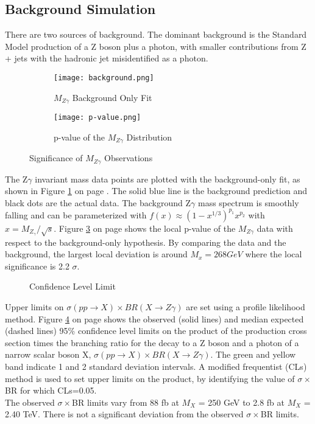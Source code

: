 \documentclass[12pt]{article}
\begin{document}
\subsection{Background Simulation}
There are two sources of background. The dominant background is the Standard Model production of a Z boson plus a photon, with smaller contributions from Z + jets with the hadronic jet misidentified as a photon.\\
\begin{figure}
\centering
\begin{subfigure}{.5\textwidth}
  \centering
  \texttt{[image: background.png]}
  \caption{$M_{Z\gamma}$ Background Only Fit}
  \label{background}
\end{subfigure}%
\begin{subfigure}{.5\textwidth}
  \centering
  \texttt{[image: p-value.png]}
  \caption{p-value of the $M_{Z\gamma}$ Distribution}
  \label{p-value}
\end{subfigure}
\caption{Significance of $M_{Z\gamma}$ Observations}
\end{figure}
The Z$\gamma$ invariant mass data points are plotted with the background-only fit, as shown in Figure \ref{background} on page \pageref{background}. The solid blue line is the background prediction and black dots are the actual data. The background Z$\gamma$ mass spectrum is smoothly falling and can be parameterized with $f(x)\approx(1-x^{1/3})^{p_1}x^{p_2}$ with $x = M_{Z_\gamma} / \sqrt{s}$. Figure \ref{p-value} on page \pageref{p-value} shows the local p-value of the $M_{Z\gamma}$ data with respect to the background-only hypothesis. By comparing the data and the background, the largest local deviation is around $M_x=268GeV$ where the local significance is 2.2 $\sigma$.\\
\begin{figure}[H]
\begin{center}
\caption[Caption for LOF]{Confidence Level Limit}
\label{CL_limit}
\end{center}
\end{figure}
Upper limits on $\sigma(pp\rightarrow X)\times BR(X\rightarrow Z\gamma)$ are set using a profile likelihood method. Figure \ref{CL_limit} on page \pageref{CL_limit} shows the observed (solid lines) and median expected (dashed lines) 95\% confidence level limits on the product of the production cross section times the branching ratio for the decay to a Z boson and a photon of a narrow scalar boson X,  $\sigma(pp\rightarrow X)\times BR(X\rightarrow Z\gamma)$. The green and yellow band indicate 1 and 2 standard deviation intervals. A modified frequentist (CLs) method is used to set upper limits on the product, by identifying the value of $\sigma\times$BR for which CLs=0.05.\\
The observed $\sigma\times$BR limits vary from 88 fb at $M_X$ = 250  GeV to 2.8 fb at $M_X$ = 2.40 TeV. There is not a significant deviation from the observed $\sigma\times$BR limits.
\end{document}
